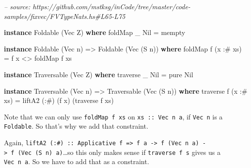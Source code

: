 \documentclass[]{article}
\newenvironment{Shaded}{}{}
\newcommand{\CommentTok}[1]{\textcolor[rgb]{0.38,0.63,0.69}{\textit{#1}}}
\newcommand{\DataTypeTok}[1]{\textcolor[rgb]{0.56,0.13,0.00}{#1}}
\newcommand{\FunctionTok}[1]{\textcolor[rgb]{0.02,0.16,0.49}{#1}}
\newcommand{\KeywordTok}[1]{\textcolor[rgb]{0.00,0.44,0.13}{\textbf{#1}}}
\newcommand{\NormalTok}[1]{#1}
\newcommand{\OtherTok}[1]{\textcolor[rgb]{0.00,0.44,0.13}{#1}}
\begin{document}
\begin{Shaded}
\begin{Highlighting}[]
\CommentTok{-- source: https://github.com/mstksg/inCode/tree/master/code-samples/fixvec/FVTypeNats.hs#L65-L75}

\KeywordTok{instance} \DataTypeTok{Foldable}\NormalTok{ (}\DataTypeTok{Vec} \DataTypeTok{Z}\NormalTok{) }\KeywordTok{where}
\NormalTok{    foldMap _ }\DataTypeTok{Nil} \FunctionTok{=}\NormalTok{ mempty}

\KeywordTok{instance} \DataTypeTok{Foldable}\NormalTok{ (}\DataTypeTok{Vec}\NormalTok{ n) }\OtherTok{=>} \DataTypeTok{Foldable}\NormalTok{ (}\DataTypeTok{Vec}\NormalTok{ (}\DataTypeTok{S}\NormalTok{ n)) }\KeywordTok{where}
\NormalTok{    foldMap f (x }\FunctionTok{:#}\NormalTok{ xs) }\FunctionTok{=}\NormalTok{ f x }\FunctionTok{<>}\NormalTok{ foldMap f xs}

\KeywordTok{instance} \DataTypeTok{Traversable}\NormalTok{ (}\DataTypeTok{Vec} \DataTypeTok{Z}\NormalTok{) }\KeywordTok{where}
\NormalTok{    traverse _ }\DataTypeTok{Nil} \FunctionTok{=}\NormalTok{ pure }\DataTypeTok{Nil}

\KeywordTok{instance} \DataTypeTok{Traversable}\NormalTok{ (}\DataTypeTok{Vec}\NormalTok{ n) }\OtherTok{=>} \DataTypeTok{Traversable}\NormalTok{ (}\DataTypeTok{Vec}\NormalTok{ (}\DataTypeTok{S}\NormalTok{ n)) }\KeywordTok{where}
\NormalTok{    traverse f (x }\FunctionTok{:#}\NormalTok{ xs) }\FunctionTok{=}\NormalTok{ liftA2 (}\FunctionTok{:#}\NormalTok{) (f x) (traverse f xs)}
\end{Highlighting}
\end{Shaded}

Note that we can only use \texttt{foldMap\ f\ xs} on \texttt{xs\ ::\ Vec\ n\ a},
if \texttt{Vec\ n} is a \texttt{Foldable}. So that's why we add that constraint.

Again,
\texttt{liftA2\ (:\#)\ ::\ Applicative\ f\ =\textgreater{}\ f\ a\ -\textgreater{}\ f\ (Vec\ n\ a)\ -\textgreater{}\ f\ (Vec\ (S\ n)\ a)}\ldots{}so
this only makes sense if \texttt{traverse\ f\ s} gives us a \texttt{Vec\ n\ a}.
So we have to add that as a constraint.
\end{document}
